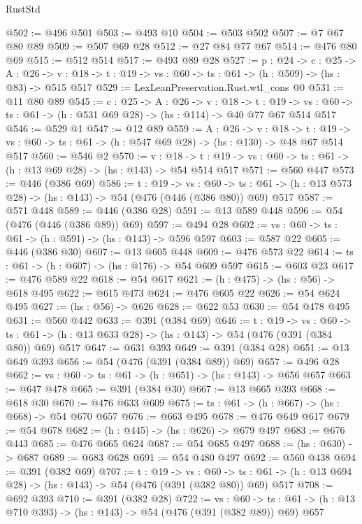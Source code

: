 \begin{lexlean}{RustStd}
\begin{coremodule}
@502 := @496 @501
@503 := @493 @10
@504 := @503 @502
@507 := @7 @67 @80 @89
@509 := @507 @69 @28
@512 := @27 @84 @77 @67
@514 := @476 @80 @69
@515 := @512 @514
@517 := @493 @89 @28
@527 := {p : @24} ->
  {c : @25} ->
  {A : @26} ->
  {v : @18} -> {t : @19} -> {vs : @60} -> {ts : @61} -> (h : @509) -> (hs : @83) -> @515 @517
@529 := LexLeanPreservation.Rust.wtl_cons @0
@531 := @11 @80 @89
@545 := {c : @25} ->
  {A : @26} ->
  {v : @18} ->
  {t : @19} ->
  {vs : @60} -> {ts : @61} -> (h : @531 @69 @28) -> (hs : @114) -> @40 @77 @67 @514 @517
@546 := @529 @1
@547 := @12 @89
@559 := {A : @26} ->
  {v : @18} ->
  {t : @19} -> {vs : @60} -> {ts : @61} -> (h : @547 @69 @28) -> (hs : @130) -> @48 @67 @514 @517
@560 := @546 @2
@570 := {v : @18} ->
  {t : @19} -> {vs : @60} -> {ts : @61} -> (h : @13 @69 @28) -> (hs : @143) -> @54 @514 @517
@571 := @560 @447
@573 := @446 (@386 @69)
@586 := {t : @19} ->
  {vs : @60} ->
  {ts : @61} -> (h : @13 @573 @28) -> (hs : @143) -> @54 (@476 (@446 (@386 @80)) @69) @517
@587 := @571 @448
@589 := @446 (@386 @28)
@591 := @13 @589 @448
@596 := @54 (@476 (@446 (@386 @89)) @69)
@597 := @494 @28
@602 := {vs : @60} -> {ts : @61} -> (h : @591) -> (hs : @143) -> @596 @597
@603 := @587 @22
@605 := @446 (@386 @30)
@607 := @13 @605 @448
@609 := @476 @573 @22
@614 := {ts : @61} -> (h : @607) -> (hs : @176) -> @54 @609 @597
@615 := @603 @23
@617 := @476 @589 @22
@618 := @54 @617
@621 := (h : @475) -> (hs : @56) -> @618 @495
@622 := @615 @473
@624 := @476 @605 @22
@626 := @54 @624 @495
@627 := (hs : @56) -> @626
@628 := @622 @53
@630 := @54 @478 @495
@631 := @560 @442
@633 := @391 (@384 @69)
@646 := {t : @19} ->
  {vs : @60} ->
  {ts : @61} -> (h : @13 @633 @28) -> (hs : @143) -> @54 (@476 (@391 (@384 @80)) @69) @517
@647 := @631 @393
@649 := @391 (@384 @28)
@651 := @13 @649 @393
@656 := @54 (@476 (@391 (@384 @89)) @69)
@657 := @496 @28
@662 := {vs : @60} -> {ts : @61} -> (h : @651) -> (hs : @143) -> @656 @657
@663 := @647 @478
@665 := @391 (@384 @30)
@667 := @13 @665 @393
@668 := @618 @30
@670 := @476 @633 @609
@675 := {ts : @61} -> (h : @667) -> (hs : @668) -> @54 @670 @657
@676 := @663 @495
@678 := @476 @649 @617
@679 := @54 @678
@682 := (h : @445) -> (hs : @626) -> @679 @497
@683 := @676 @443
@685 := @476 @665 @624
@687 := @54 @685 @497
@688 := (hs : @630) -> @687
@689 := @683 @628
@691 := @54 @480 @497
@692 := @560 @438
@694 := @391 (@382 @69)
@707 := {t : @19} ->
  {vs : @60} ->
  {ts : @61} -> (h : @13 @694 @28) -> (hs : @143) -> @54 (@476 (@391 (@382 @80)) @69) @517
@708 := @692 @393
@710 := @391 (@382 @28)
@722 := {vs : @60} ->
  {ts : @61} -> (h : @13 @710 @393) -> (hs : @143) -> @54 (@476 (@391 (@382 @89)) @69) @657

\end{coremodule}
\end{lexlean}
